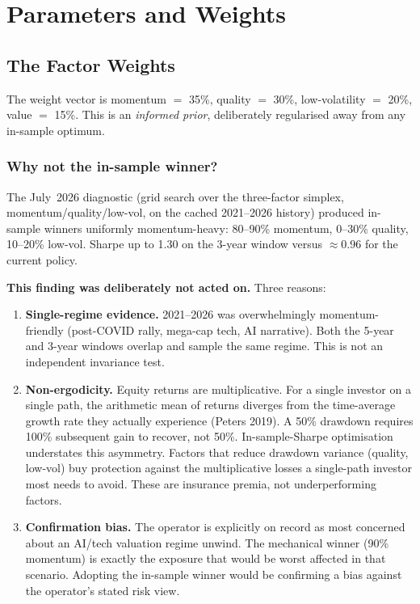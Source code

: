 \documentclass[11pt,a4paper]{article}
\begin{document}
\section{Parameters and Weights}
\label{sec:weights}

\subsection{The Factor Weights}

The weight vector is momentum $=$ 35\%, quality $=$ 30\%, low-volatility $=$ 20\%, value $=$ 15\%. This is an \emph{informed prior}, deliberately regularised away from any in-sample optimum.

\subsubsection{Why not the in-sample winner?}

The July~2026 diagnostic (grid search over the three-factor simplex, momentum/quality/low-vol, on the cached 2021--2026 history) produced in-sample winners uniformly momentum-heavy: 80--90\% momentum, 0--30\% quality, 10--20\% low-vol. Sharpe up to 1.30 on the 3-year window versus $\approx$0.96 for the current policy.

\textbf{This finding was deliberately not acted on.} Three reasons:

\begin{enumerate}[noitemsep]
    \item \textbf{Single-regime evidence.} 2021--2026 was overwhelmingly momentum-friendly (post-COVID rally, mega-cap tech, AI narrative). Both the 5-year and 3-year windows overlap and sample the same regime. This is not an independent invariance test.
    \item \textbf{Non-ergodicity.} Equity returns are multiplicative. For a single investor on a single path, the arithmetic mean of returns diverges from the time-average growth rate they actually experience (Peters 2019). A 50\% drawdown requires 100\% subsequent gain to recover, not 50\%. In-sample-Sharpe optimisation understates this asymmetry. Factors that reduce drawdown variance (quality, low-vol) buy protection against the multiplicative losses a single-path investor most needs to avoid. These are insurance premia, not underperforming factors.
    \item \textbf{Confirmation bias.} The operator is explicitly on record as most concerned about an AI/tech valuation regime unwind. The mechanical winner (90\% momentum) is exactly the exposure that would be worst affected in that scenario. Adopting the in-sample winner would be confirming a bias against the operator's stated risk view.
\end{enumerate}
\end{document}
